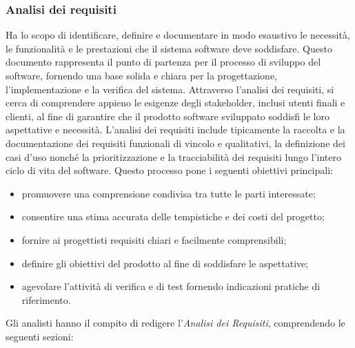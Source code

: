 \subsubsection{Analisi dei requisiti}
Ha lo scopo di identificare, definire e documentare in modo esaustivo le necessità, le funzionalità e le prestazioni che il sistema software deve soddisfare. Questo documento rappresenta il punto di partenza per il processo di sviluppo del software, fornendo una base solida e chiara per la progettazione, l'implementazione e la verifica del sistema. Attraverso l'analisi dei requisiti, si cerca di comprendere appieno le esigenze degli stakeholder, inclusi utenti finali e clienti, al fine di garantire che il prodotto software sviluppato soddisfi le loro aspettative e necessità. L'analisi dei requisiti include tipicamente la raccolta e la documentazione dei requisiti funzionali di vincolo e qualitativi, la definizione dei casi d'uso nonché la prioritizzazione e la tracciabilità dei requisiti lungo l'intero ciclo di vita del software.
\newpage
{}
Questo processo pone i seguenti obiettivi principali:
\begin{itemize}
	\item promuovere una comprensione condivisa tra tutte le parti interessate;
	\item consentire una stima accurata delle tempistiche e dei costi del progetto;
	\item fornire ai progettisti requisiti chiari e facilmente comprensibili;
	\item definire gli obiettivi del prodotto al fine di soddisfare le aspettative;
	\item agevolare l'attività di verifica e di test fornendo indicazioni pratiche di riferimento.
\end{itemize}
Gli analisti hanno il compito di redigere l'\textit{Analisi dei Requisiti}, comprendendo le seguenti sezioni:
